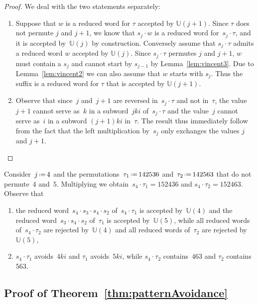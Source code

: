 \documentclass[ALCO]{cedram}
\newcommand{\eqdef}{\mbox{\,\raisebox{0.2ex}{\scriptsize\ensuremath{\mathrm:}}\ensuremath{=}\,}}
\newcommand{\automatonU}{\mathbb{U}}
\begin{document}
\begin{proof}
We deal with the two statements separately:
\begin{enumerate} 
	\item Suppose that $w$ is a reduced word for $\tau$ accepted by $\automatonU(j+1)$. Since $\tau$ does not permute $j$ and $j+1$, we know that $s_j \cdot w$ is a reduced word for~$s_j \cdot \tau$, and it is accepted by~$\automatonU(j)$ by construction. Conversely assume that $s_j \cdot \tau$ admits a reduced word $w$ accepted by $\automatonU(j)$. Since $s_j \cdot \tau$ permutes $j$ and $j+1$, $w$ must contain a $s_j$ and cannot start by $s_{j-1}$ by Lemma~\ref{lem:vincent3}. Due to Lemma~\ref{lem:vincent2} we can also assume that $w$ starts with $s_j$. Thus the suffix is a reduced word for $\tau$ that is accepted by $\automatonU(j+1)$.
	\item Observe that since~$j$ and~$j+1$ are reversed in~$s_j \cdot \tau$ and not in~$\tau$, the value $j+1$ cannot serve as~$k$ in a subword~$jki$ of~$s_j \cdot \tau$ and the value~$j$ cannot serve as~$i$ in a subword $(j+1)ki$ in~$\tau$. The result thus immediately follow from the fact that the left multiplication by~$s_j$ only exchanges the values $j$ and $j+1$.
	\qedhere
\end{enumerate}
\end{proof}

\begin{example}\label{exm:lemVincent4}
Consider~$j \eqdef 4$ and the permutations~$\tau_1 \eqdef 142536$ and~$\tau_2 \eqdef 142563$ that do not permute~$4$ and~$5$. 
Multiplying we obtain~$s_4 \cdot \tau_1 = 152436$ and ${s_4 \cdot \tau_2 = 152463}$. Observe that
\begin{enumerate}
	\item the reduced word~$s_4 \cdot s_3 \cdot s_4 \cdot s_2$ of~$s_4 \cdot \tau_1$ is accepted by~$\automatonU(4)$ and the reduced word~$s_3 \cdot s_4 \cdot s_2$ of~$\tau_1$ is accepted by~$\automatonU(5)$, while all reduced words of~$s_4 \cdot \tau_2$ are rejected by~$\automatonU(4)$ and all reduced words of~$\tau_2$ are rejected by~$\automatonU(5)$,
	\item $s_4 \cdot \tau_1$ avoids~$4ki$ and $\tau_1$ avoids~$5ki$, while $s_4 \cdot \tau_2$ contains~$463$ and $\tau_2$ contains~$563$.
\end{enumerate}
\end{example}

\subsection{Proof of Theorem~\ref{thm:patternAvoidance}}
\end{document}
